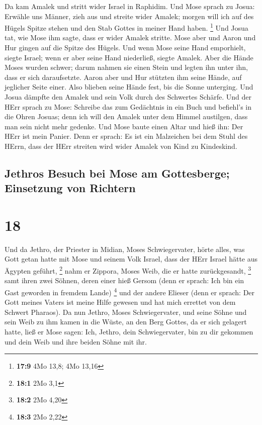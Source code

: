  Da kam Amalek und stritt wider Israel in Raphidim.
 Und Mose sprach zu Josua: Erwähle uns Männer, zieh aus
und streite wider Amalek; morgen will ich auf des Hügels Spitze stehen
und den Stab Gottes in meiner Hand haben. \footnote{\textbf{17:9} 4Mo
  13,8; 4Mo 13,16}  Und Josua tat, wie Mose ihm sagte,
dass er wider Amalek stritte. Mose aber und Aaron und Hur gingen auf die
Spitze des Hügels.  Und wenn Mose seine Hand emporhielt,
siegte Israel; wenn er aber seine Hand niederließ, siegte Amalek.
 Aber die Hände Moses wurden schwer; darum nahmen sie
einen Stein und legten ihn unter ihn, dass er sich daraufsetzte. Aaron
aber und Hur stützten ihm seine Hände, auf jeglicher Seite einer. Also
blieben seine Hände fest, bis die Sonne unterging.  Und
Josua dämpfte den Amalek und sein Volk durch des Schwertes Schärfe.
 Und der HErr sprach zu Mose: Schreibe das zum Gedächtnis
in ein Buch und befiehl's in die Ohren Josuas; denn ich will den Amalek
unter dem Himmel austilgen, dass man sein nicht mehr gedenke.
 Und Mose baute einen Altar und hieß ihn: Der HErr ist
mein Panier.  Denn er sprach: Es ist ein Malzeichen bei
dem Stuhl des HErrn, dass der HErr streiten wird wider Amalek von Kind
zu Kindeskind.

\hypertarget{jethros-besuch-bei-mose-am-gottesberge-einsetzung-von-richtern}{%
\subsection{Jethros Besuch bei Mose am Gottesberge; Einsetzung von
Richtern}\label{jethros-besuch-bei-mose-am-gottesberge-einsetzung-von-richtern}}

\hypertarget{section-17}{%
\section{18}\label{section-17}}

 Und da Jethro, der Priester in Midian, Moses
Schwiegervater, hörte alles, was Gott getan hatte mit Mose und seinem
Volk Israel, dass der HErr Israel hätte aus Ägypten geführt, \footnote{\textbf{18:1}
  2Mo 3,1}  nahm er Zippora, Moses Weib, die er hatte
zurückgesandt, \footnote{\textbf{18:2} 2Mo 4,20}  samt
ihren zwei Söhnen, deren einer hieß Gersom (denn er sprach: Ich bin ein
Gast geworden in fremdem Lande) \footnote{\textbf{18:3} 2Mo 2,22}
 und der andere Elieser (denn er sprach: Der Gott meines
Vaters ist meine Hilfe gewesen und hat mich errettet von dem Schwert
Pharaos).  Da nun Jethro, Moses Schwiegervater, und seine
Söhne und sein Weib zu ihm kamen in die Wüste, an den Berg Gottes, da er
sich gelagert hatte,  ließ er Mose sagen: Ich, Jethro,
dein Schwiegervater, bin zu dir gekommen und dein Weib und ihre beiden
Söhne mit ihr.

